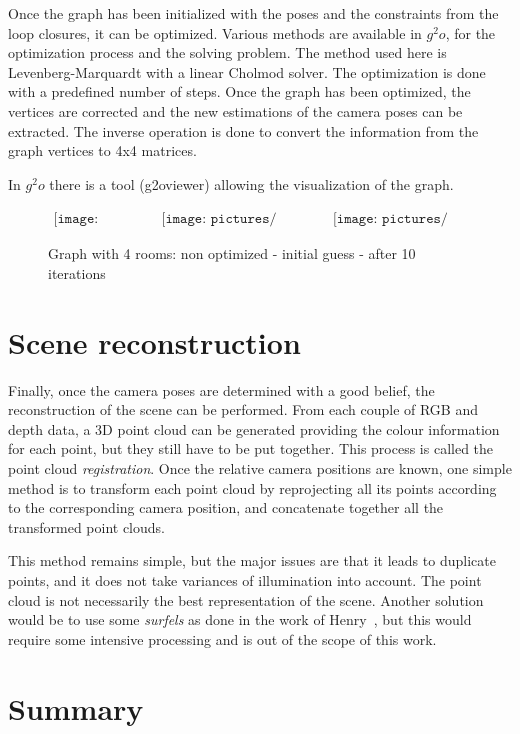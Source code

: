 Once the graph has been initialized with the poses and the constraints from the loop closures, it can be optimized. Various methods are available in $g^2o$, for the optimization process and the solving problem. The method used here is Levenberg-Marquardt with a linear Cholmod solver. The optimization is done with a predefined number of steps. Once the graph has been optimized, the vertices are corrected and the new estimations of the camera poses can be extracted. The inverse operation is done to convert the information from the graph vertices to 4x4 matrices.

In $g^2o$ there is a tool (g2oviewer) allowing the visualization of the graph.

\begin{figure}[H]
\centering$
 \begin{array}{ccc}
 \texttt{[image: pictures/graph4\_base]} &
 \texttt{[image: pictures/graph4\_initial\_guess]} &
 \texttt{[image: pictures/graph4\_optimized]}
 \end{array}$
\caption{Graph with 4 rooms: non optimized - initial guess - after 10 iterations}
\end{figure}

\section{Scene reconstruction}

Finally, once the camera poses are determined with a good belief, the reconstruction of the scene can be performed. From each couple of RGB and depth data, a 3D point cloud can be generated providing the colour information for each point, but they still have to be put together. This process is called the point cloud \emph{registration}. Once the relative camera positions are known, one simple method is to transform each point cloud by reprojecting all its points according to the corresponding camera position, and concatenate together all the transformed point clouds.

This method remains simple, but the major issues are that it leads to duplicate points, and it does not take variances of illumination into account. The point cloud is not necessarily the best representation of the scene. Another solution would be to use some \emph{surfels} as done in the work of Henry~\cite{Henry_RGBD_2010}, but this would require some intensive processing and is out of the scope of this work.

\section{Summary}

